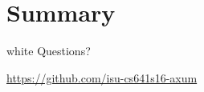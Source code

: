 \section*{Summary}





\begin{frame}
\begin{beamercolorbox}[center]{white}
  {\Large Questions?}

  \vspace{2em}\hfill

  \url{https://github.com/isu-cs641s16-axum}
\end{beamercolorbox}
\end{frame}
